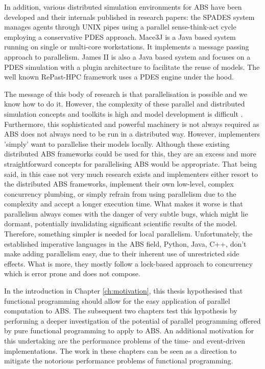 In addition, various distributed simulation environments for ABS have been developed and their internals published in research papers: the SPADES system \cite{riley_next_2003} manages agents through UNIX pipes using a parallel sense-think-act cycle employing a conservative PDES approach. Mace3J \cite{gasser_mace3j:_2002} is a Java based system running on single or multi-core workstations. It implements a message passing approach to parallelism. James II \cite{himmelspach_plugn_2007} is also a Java based system and focuses on a PDES simulation with a plugin architecture to facilitate the reuse of models. The well known RePast-HPC \cite{gorur_repast_2016, minson_distributing_2008} framework uses a PDES engine under the hood. 

The message of this body of research is that parallelisation is possible and we know how to do it. However, the complexity of these parallel and distributed simulation concepts and toolkits is high and model development is difficult \cite{abar_agent_2017}. Furthermore, this sophisticated and powerful machinery is not always required as ABS does not always need to be run in a distributed way. However, implementers 'simply' want to parallelise their models locally. Although these existing distributed ABS frameworks could be used for this, they are an excess and more straightforward concepts for parallelising ABS would be appropriate. That being said, in this case not very much research exists and implementers either resort to the distributed ABS frameworks, implement their own low-level, complex concurrency plumbing, or simply refrain from using parallelism due to the complexity and accept a longer execution time. What makes it worse is that parallelism always comes with the danger of very subtle bugs, which might lie dormant, potentially invalidating significant scientific results of the model. Therefore, something simpler is needed for local parallelism. Unfortunately, the established imperative languages in the ABS field, Python, Java, C++, don't make adding parallelism easy, due to their inherent use of unrestricted side effects. What is more, they mostly follow a lock-based approach to concurrency which is error prone and does not compose.

\medskip

In the introduction in Chapter \ref{ch:motivation}, this thesis hypothesised that functional programming should allow for the easy application of parallel computation to ABS. The subsequent two chapters test this hypothesis by performing a deeper investigation of the potential of parallel programming offered by pure functional programming to apply to ABS. An additional motivation for this undertaking are the performance problems of the time- and event-driven implementations. The work in these chapters can be seen as a direction to mitigate the notorious performance problems of functional programming.

